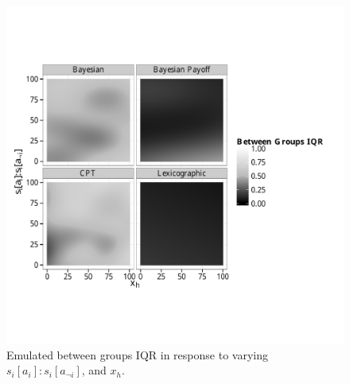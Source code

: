 \begin{figure}[H]
\begin{adjustbox}{center}\includegraphics[width=0.8\linewidth]{figures/unfixed_emu_payoff_honesty_group_iqr}\end{adjustbox}
\caption{Emulated between groups IQR in response to varying \(s_{i}[a_{i}]:s_{i}[a_{\neg i}]\), and \(x_{h}\).}
\label{fig:emulated_payoff_group_iqr}
\end{figure}
